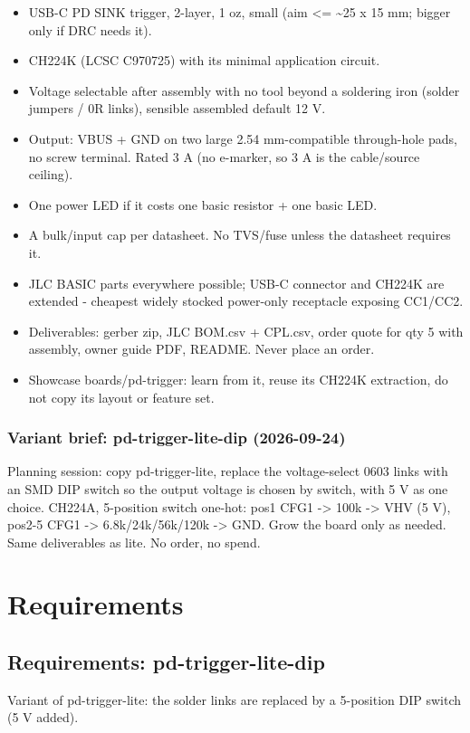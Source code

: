 \documentclass[11pt,a4paper]{article}
\begin{document}
\begin{itemize}
\item USB-C PD SINK trigger, 2-layer, 1 oz, small (aim \textless{}= \textasciitilde{}25 x 15 mm; bigger only if DRC needs it).
\item CH224K (LCSC C970725) with its minimal application circuit.
\item Voltage selectable after assembly with no tool beyond a soldering iron (solder jumpers /
0R links), sensible assembled default 12 V.
\item Output: VBUS + GND on two large 2.54 mm-compatible through-hole pads, no screw terminal.
Rated 3 A (no e-marker, so 3 A is the cable/source ceiling).
\item One power LED if it costs one basic resistor + one basic LED.
\item A bulk/input cap per datasheet. No TVS/fuse unless the datasheet requires it.
\item JLC BASIC parts everywhere possible; USB-C connector and CH224K are extended - cheapest
widely stocked power-only receptacle exposing CC1/CC2.
\item Deliverables: gerber zip, JLC BOM.csv + CPL.csv, order quote for qty 5 with assembly,
owner guide PDF, README. Never place an order.
\item Showcase boards/pd-trigger: learn from it, reuse its CH224K extraction, do not copy its
layout or feature set.
\end{itemize}
\subsubsection*{Variant brief: pd-trigger-lite-dip (2026-09-24)}
Planning session: copy pd-trigger-lite, replace the voltage-select 0603 links with an SMD DIP switch so the output voltage is chosen by switch, with 5 V as one choice. CH224A, 5-position switch one-hot: pos1 CFG1 -\textgreater{} 100k -\textgreater{} VHV (5 V), pos2-5 CFG1 -\textgreater{} 6.8k/24k/56k/120k -\textgreater{} GND. Grow the board only as needed. Same deliverables as lite. No order, no spend.

\section{Requirements}
\subsection*{Requirements: pd-trigger-lite-dip}
Variant of pd-trigger-lite: the solder links are replaced by a 5-position DIP switch (5 V added).
\end{document}
